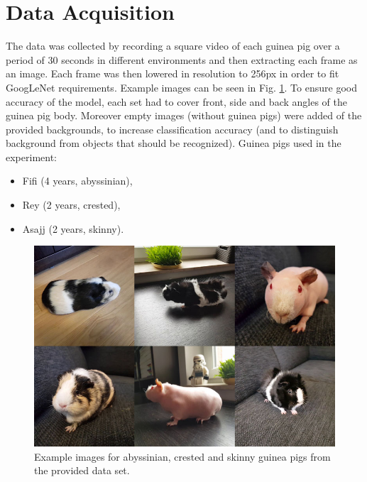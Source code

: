 \documentclass[10pt,journal,compsoc]{IEEEtran}
\begin{document}
    \section{Data Acquisition}
    The data was collected by recording a square video of each guinea pig over a period of 30 seconds in different environments and then extracting each frame as an image. Each frame was then lowered in resolution to 256px in order to fit GoogLeNet requirements. Example images can be seen in Fig. \ref{fig:pigs}.
    \newline\newline
    To ensure good accuracy of the model, each set had to cover front, side and back angles of the guinea pig body. Moreover empty images (without guinea pigs) were added of the provided backgrounds, to increase classification accuracy (and to distinguish background from objects that should be recognized).
    \newline\newline
    Guinea pigs used in the experiment:

    \begin{itemize}
        \item Fifi (4 years, abyssinian),
        \item Rey (2 years, crested),
        \item Asajj (2 years, skinny).
    \end{itemize}

    \begin{figure}[h]
        \includegraphics[width=\linewidth]{pig_dataset.png}
        \caption{Example images for abyssinian, crested and skinny guinea pigs from the provided data set.}
        \label{fig:pigs}
        \centering
    \end{figure}
    
\end{document}
